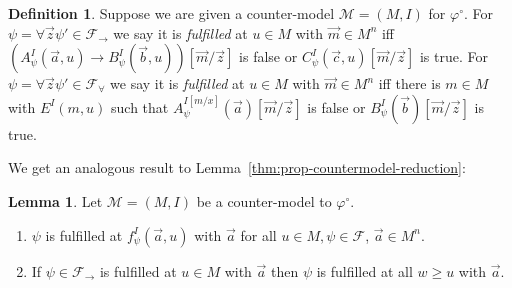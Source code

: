 \documentclass[a4paper,11pt]{report}
\theoremstyle{definition}
\theoremstyle{definition}
\theoremstyle{definition}
\newtheorem{lemma}[theorem]{Lemma}
\theoremstyle{definition}
\theoremstyle{definition}
\newtheorem{definition}[theorem]{Definition}
\theoremstyle{definition}
\theoremstyle{definition}
\begin{document}
	
	\begin{definition}
		\label{def:fo-fulfilled}
		Suppose we are given a counter-model $\mathcal M = (M, I)$ for $\varphi^\circ$. For $\psi = \forall\vec z\psi'\in\mathcal F_\to$ we say it is \emph{fulfilled} at $u\in M$ with $\vec m\in M^n$ iff $(A_\psi^I(\vec a, u)\to B_\psi^I(\vec b, u))[\vec m/\vec z]$ is false or $C_\psi^I(\vec c, u)[\vec m/\vec z]$ is true.
		For $\psi = \forall\vec z\psi'\in\mathcal F_\forall$ we say it is \emph{fulfilled} at $u\in M$ with $\vec m\in M^n$ iff there is $m\in M$ with $E^{I}(m, u)$ such that $A^{I[m/x]}_\psi(\vec a)[\vec m/\vec z]$ is false or $B_\psi^I(\vec b)[\vec m/\vec z]$ is true.
	\end{definition}
	
	We get an analogous result to Lemma~\ref{thm:prop-countermodel-reduction}:
	
	\begin{lemma}
		\label{thm:fo-countermodel-reduction}
		Let $\mathcal M = (M, I)$ be a counter-model to $\mathcal \varphi^\circ$.
		\begin{enumerate}
			\item $\psi$ is fulfilled at $f_\psi^I(\vec a, u)$ with $\vec a$ for all $u\in M, \psi\in\mathcal F$, $\vec a\in M^n$.
			\item If $\psi\in\mathcal F_\to$ is fulfilled at $u\in M$ with $\vec a$ then $\psi$ is fulfilled at all $w\geq u$ with $\vec a$.
		\end{enumerate}	
	\end{lemma}
	
\end{document}
